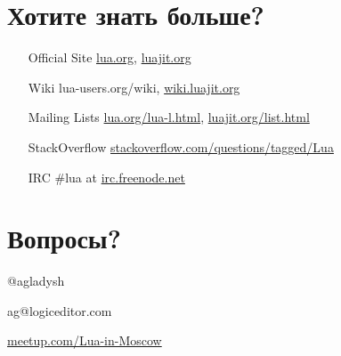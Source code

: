 \documentclass[aspectratio=169,handout,bigger]{beamer}
\begin{document}

\section{Хотите знать больше?}

\begin{frame}
  \begin{center}
  \begin{minipage}{0.6\linewidth}
  \begin{itemize}
    \item[Official Site] \href{http://lua.org}{lua.org}, \href{http://luajit.org}{luajit.org}
    \item[Wiki] lua-users.org/wiki, \href{http://wiki.luajit.org}{wiki.luajit.org}
    \item[Mailing Lists] \href{http://lua.org/lua-l.html}{lua.org/lua-l.html}, \href{http://luajit.org/list.html}{luajit.org/list.html}
    \item[StackOverflow] \href{http://stackoverflow.com/questions/tagged/Lua}{stackoverflow.com/questions/tagged/Lua}
    \item[IRC] \#lua at \href{http://irc.freenode.net}{irc.freenode.net}
  \end{itemize}
  \end{minipage}
  \end{center}
\end{frame}


\section*{Вопросы?}

\begin{frame}

\begin{center}
\Huge{@agladysh}
\end{center}

\begin{center}
\Large{ag@logiceditor.com}
\end{center}

\begin{center}
\href{http://meetup.com/Lua-in-Moscow}{meetup.com/Lua-in-Moscow}
\end{center}

\end{frame}

\end{document}
